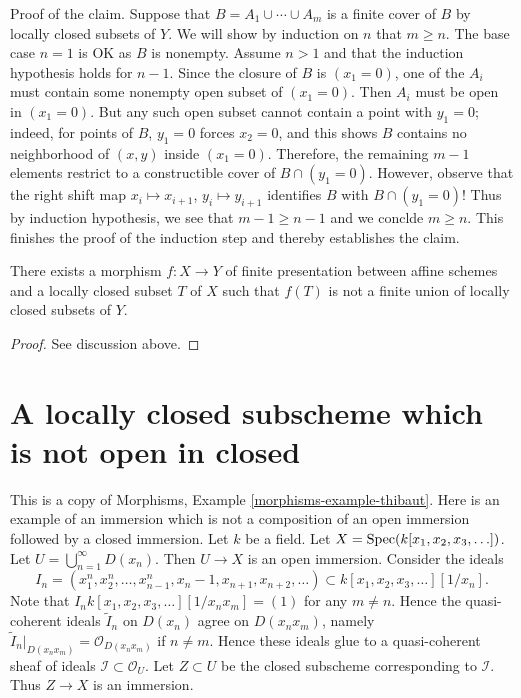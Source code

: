 \medskip\noindent
Proof of the claim. Suppose that $B = A_1 \cup \cdots \cup A_m$
is a finite cover of $B$ by locally closed subsets of $Y$.
We will show by induction on $n$ that $m \geq n$. The base
case $n = 1$ is OK as $B$ is nonempty. Assume $n > 1$ and that
the induction hypothesis holds for $n - 1$. Since the closure of $B$ is
$(x_1 = 0)$, one of the $A_i$ must contain some nonempty open subset of
$(x_1 = 0)$. Then $A_i$ must be open in $(x_1 = 0)$.
But any such open subset cannot contain a point with
$y_1 = 0$; indeed, for points of $B$, $y_1 = 0$ forces $x_2 = 0$,
and this shows $B$ contains no neighborhood of $(x, y)$ inside $(x_1 = 0)$.
Therefore, the remaining $m - 1$ elements restrict
to a constructible cover of $B \cap (y_1 = 0)$.
However, observe that the right shift map
$x_i \mapsto x_{i + 1}$, $y_i \mapsto y_{i + 1}$ identifies $B$
with $B \cap (y_1 = 0)$! Thus by induction hypothesis, we see that
$m - 1 \geq n - 1$ and we conclde $m \geq n$. This finishes
the proof of the induction step and thereby establishes the claim.

\begin{lemma}
\label{lemma-no-chevalley}
There exists a morphism $f : X \to Y$ of finite presentation
between affine schemes and a locally closed subset $T$ of $X$
such that $f(T)$ is not a finite union of locally closed subsets of $Y$.
\end{lemma}

\begin{proof}
See discussion above.
\end{proof}










\section{A locally closed subscheme which is not open in closed}
\label{section-strange-immersion}

\noindent
This is a copy of
Morphisms, Example \ref{morphisms-example-thibaut}.
Here is an example of an immersion which is not a composition of an
open immersion followed by a closed immersion.
Let $k$ be a field.
Let $X = \mathop{\mathrm{Spec}}(k[x_1, x_2, x_3, \ldots])$.
Let $U = \bigcup_{n = 1}^{\infty} D(x_n)$.
Then $U \to X$ is an open immersion.
Consider the ideals
$$
I_n =
(x_1^n, x_2^n, \ldots, x_{n - 1}^n, x_n - 1, x_{n + 1}, x_{n + 2}, \ldots)
\subset
k[x_1, x_2, x_3, \ldots][1/x_n].
$$
Note that $I_n k[x_1, x_2, x_3, \ldots][1/x_nx_m] = (1)$
for any $m \not = n$. Hence the quasi-coherent ideals
$\widetilde I_n$ on $D(x_n)$ agree on $D(x_nx_m)$, namely
$\widetilde I_n|_{D(x_nx_m)} = \mathcal{O}_{D(x_n x_m)}$ if
$n \not = m$. Hence these ideals glue to a quasi-coherent sheaf of ideals
$\mathcal{I} \subset \mathcal{O}_U$.
Let $Z \subset U$ be the closed subscheme corresponding to
$\mathcal{I}$. Thus $Z \to X$ is an immersion.

